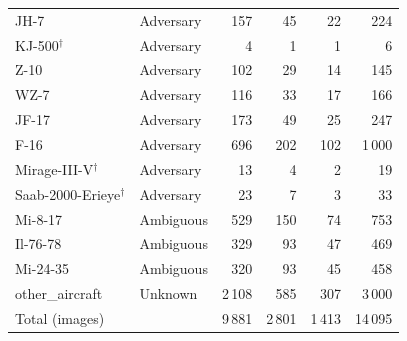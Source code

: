 \begin{table}[t]
\begin{tabular}{@{}llrrrr@{}}
JH-7 & Adversary & 157 & 45 & 22 & 224 \\
KJ-500$^\dagger$ & Adversary & 4 & 1 & 1 & 6 \\
Z-10 & Adversary & 102 & 29 & 14 & 145 \\
WZ-7 & Adversary & 116 & 33 & 17 & 166 \\
JF-17 & Adversary & 173 & 49 & 25 & 247 \\
F-16 & Adversary & 696 & 202 & 102 & 1\,000 \\
Mirage-III-V$^\dagger$ & Adversary & 13 & 4 & 2 & 19 \\
Saab-2000-Erieye$^\dagger$ & Adversary & 23 & 7 & 3 & 33 \\
\addlinespace
Mi-8-17 & Ambiguous & 529 & 150 & 74 & 753 \\
Il-76-78 & Ambiguous & 329 & 93 & 47 & 469 \\
Mi-24-35 & Ambiguous & 320 & 93 & 45 & 458 \\
\addlinespace
other\_aircraft & Unknown & 2\,108 & 585 & 307 & 3\,000 \\
\midrule
Total (images) & & 9\,881 & 2\,801 & 1\,413 & 14\,095 \\
\bottomrule
\end{tabular}
\end{table}
